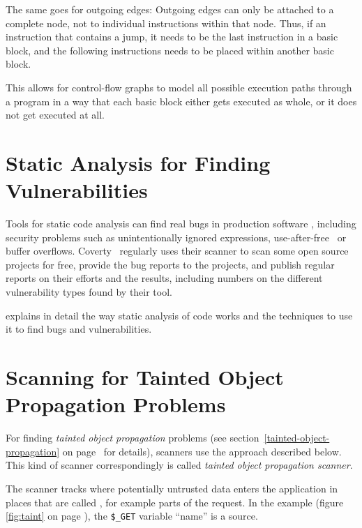 The same goes for outgoing edges: Outgoing edges can only be attached to a complete node, not to individual instructions within that node. Thus, if an instruction that contains a jump, it needs to be the last instruction in a basic block, and the following instructions needs to be placed within another basic block.

This allows for control-flow graphs to model all possible execution paths through a program in a way that each basic block either gets executed as whole, or it does not get executed at all.



\section{Static Analysis for Finding Vulnerabilities}

Tools for static code analysis can find real bugs in production software \cite{findbugs, evaluating}, including security problems such as unintentionally ignored expressions, use-after-free~\cite{use-after-free-definition} or buffer overflows. Coverty~\cite{coverity-report} regularly uses their scanner to scan some open source projects for free, provide the bug reports to the projects, and publish regular reports on their efforts and the results, including numbers on the different vulnerability types found by their tool.

\cite{chess-west} explains in detail the way static analysis of code works and the techniques to use it to find bugs and vulnerabilities.



\section{Scanning for Tainted Object Propagation Problems}
\label{tainting}

For finding \emph{tainted object propagation} problems (see section~\ref{tainted-object-propagation} on page~\pageref{tainted-object-propagation} for details), scanners use the approach described below.~\cite{finding-security-vulnerabilities, chess-west} This kind of scanner correspondingly is called \emph{tainted object propagation scanner}.

The scanner tracks where potentially untrusted data enters the application in places that are called , for example parts of the request. In the example (figure \ref{fig:taint} on page \pageref{fig:taint}), the \texttt{\$\_GET} variable ``name'' is a source.


